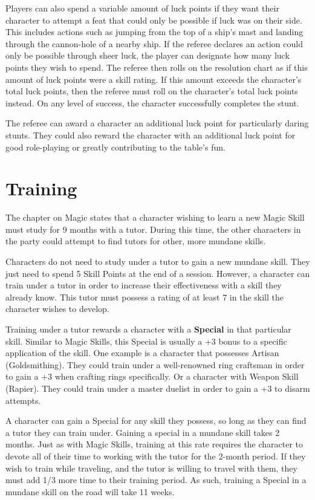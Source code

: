 \documentclass[oneside]{book}
\begin{document}
\begin{multicols}{2}
Players can also spend a variable amount of luck points if they want their character to attempt a feat that could only be possible if luck was on their side. This includes actions such as jumping from the top of a ship's mast and landing through the cannon-hole of a nearby ship. If the referee declares an action could only be possible through sheer luck, the player can designate how many luck points they wish to spend. The referee then rolls on the resolution chart as if this amount of luck points were a skill rating. If this amount exceeds the character's total luck points, then the referee must roll on the character's total luck points instead. On any level of success, the character successfully completes the stunt. 

The referee can award a character an additional luck point for particularly daring stunts. They could also reward the character with an additional luck point for good role-playing or greatly contributing to the table's fun. 

\section{Training}

The chapter on Magic states that a character wishing to learn a new Magic Skill must study for 9 months with a tutor. During this time, the other characters in the party could attempt to find tutors for other, more mundane skills. 

Characters do not need to study under a tutor to gain a new mundane skill. They just need to spend 5 Skill Points at the end of a session. However, a character can train under a tutor in order to increase their effectiveness with a skill they already know. This tutor must possess a rating of at least 7 in the skill the character wishes to develop.

Training under a tutor rewards a character with a \textbf{Special} in that particular skill. Similar to Magic Skills, this Special is usually a +3 bonus to a specific application of the skill. One example is a character that possesses Artisan (Goldsmithing). They could train under a well-renowned ring craftsman in order to gain a +3 when crafting rings specifically. Or a character with Weapon Skill (Rapier). They could train under a master duelist in order to gain a +3 to disarm attempts. 

A character can gain a Special for any skill they possess, so long as they can find a tutor they can train under. Gaining a special in a mundane skill takes 2 months. Just as with Magic Skills, training at this rate requires the character to devote all of their time to working with the tutor for the 2-month period. If they wish to train while traveling, and the tutor is willing to travel with them, they must add 1/3 more time to their training period. As such, training a Special in a mundane skill on the road will take 11 weeks. 


\end{multicols}
\end{document}
